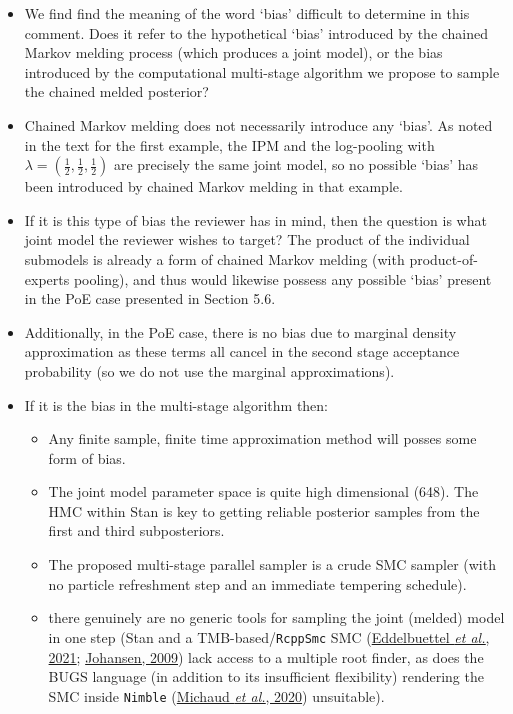 \documentclass[
  10pt,
  a4paper,
]{article}
\providecommand{\tightlist}{%
  \setlength{\itemsep}{0pt}\setlength{\parskip}{0pt}}
\begin{document}
\begin{itemize}
\item
  We find find the meaning of the word `bias' difficult to determine in
  this comment. Does it refer to the hypothetical `bias' introduced by
  the chained Markov melding process (which produces a joint model), or
  the bias introduced by the computational multi-stage algorithm we
  propose to sample the chained melded posterior?
\item
  Chained Markov melding does not necessarily introduce any `bias'. As
  noted in the text for the first example, the IPM and the log-pooling
  with \(\lambda = (\frac{1}{2}, \frac{1}{2}, \frac{1}{2})\) are
  precisely the same joint model, so no possible `bias' has been
  introduced by chained Markov melding in that example.
\item
  If it is this type of bias the reviewer has in mind, then the question
  is what joint model the reviewer wishes to target? The product of the
  individual submodels is already a form of chained Markov melding (with
  product-of-experts pooling), and thus would likewise possess any
  possible `bias' present in the PoE case presented in Section 5.6.
\item
  Additionally, in the PoE case, there is no bias due to marginal
  density approximation as these terms all cancel in the second stage
  acceptance probability (so we do not use the marginal approximations).
\item
  If it is the bias in the multi-stage algorithm then:

  \begin{itemize}
  \tightlist
  \item
    Any finite sample, finite time approximation method will posses some
    form of bias.
  \item
    The joint model parameter space is quite high dimensional (648). The
    HMC within Stan is key to getting reliable posterior samples from
    the first and third subposteriors.
  \item
    The proposed multi-stage parallel sampler is a crude SMC sampler
    (with no particle refreshment step and an immediate tempering
    schedule).
  \item
    there genuinely are no generic tools for sampling the joint (melded)
    model in one step (Stan and a TMB-based/\texttt{RcppSmc} SMC
    (\protect\hyperlink{ref-eddelbuettel_rcppsmc_2021}{Eddelbuettel
    \emph{et al.}, 2021};
    \protect\hyperlink{ref-johansen_smctc_2009}{Johansen, 2009}) lack
    access to a multiple root finder, as does the BUGS language (in
    addition to its insufficient flexibility) rendering the SMC inside
    \texttt{Nimble}
    (\protect\hyperlink{ref-michaud_sequential_2020}{Michaud \emph{et
    al.}, 2020}) unsuitable).


\end{itemize}
\end{itemize}
\end{document}
